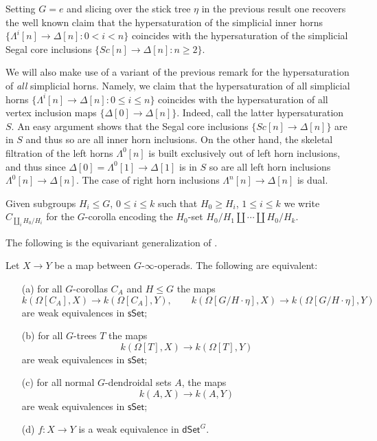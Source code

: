 \documentclass[a4paper,10pt,draft]{article}%
\numberwithin{equation}{section}%
\begin{document}
\begin{remark}
	Setting $G=e$ and slicing over the stick tree $\eta$ in the previous result
	one recovers the well known claim that 
	the hypersaturation of the simplicial inner horns
	$\{\Lambda^i[n] \to \Delta[n] \colon 0< i < n\}$
	coincides with the hypersaturation of the simplicial Segal core inclusions
	$\{Sc[n] \to \Delta[n]\colon n \geq 2\}$.
\end{remark}


\begin{remark}\label{HYPERSATKAN REM}
	We will also make use of a variant of the previous remark for the hypersaturation of \textit{all} simplicial horns.
	Namely, we claim that the hypersaturation of all simplicial horns 
	$\{\Lambda^i[n] \to \Delta[n] \colon 0 \leq i \leq n\}$
	coincides with the hypersaturation of all vertex inclusion maps
	$\{\Delta[0] \to \Delta[n]\}$.
	Indeed, call the latter hypersaturation $S$. 
	An easy argument shows that the Segal core inclusions 
	$\{Sc[n] \to \Delta[n]\}$ are in $S$ and thus so are all inner horn inclusions. On the other hand, the skeletal filtration of the left horns $\Lambda^0[n]$ is built exclusively out of left horn inclusions, and thus since $\Delta[0]=\Lambda^0[1] \to \Delta[1]$ is in $S$ so are all left horn inclusions 
	$\Lambda^0[n] \to \Delta[n]$. The case of right horn inclusions $\Lambda^n[n] \to \Delta[n]$ is dual.
\end{remark}

\begin{notation}
Given subgroups $H_i \leq G$, $0\leq i \leq k$ such that
$H_0 \geq H_i$, $1 \leq i \leq k$ we write
$C_{\amalg_i H_0/H_i}$ for the $G$-corolla encoding the 
$H_0$-set $H_0/H_1 \amalg \cdots \amalg H_0/H_k$.
\end{notation}


The following is the equivariant generalization of 
\cite[Thm. 3.5]{CM13a}.

\begin{proposition}\label{TFAE PROP}
Let $X \to Y$ be a map between $G$-$\infty$-operads. The following are equivalent:
\begin{enumerate}
	\item[(a)] for all $G$-corollas $C_A$ and $H\leq G$ the maps
\[k(\Omega[C_A],X) \to k(\Omega[C_A],Y), \qquad
k(\Omega[G/H \cdot \eta],X) \to k(\Omega[G/H \cdot \eta],Y)
\]
are weak equivalences in $\mathsf{sSet}$;
	\item[(b)] for all $G$-trees $T$ the maps 
	\[k(\Omega[T],X) \to k(\Omega[T],Y) \]
are weak equivalences in $\mathsf{sSet}$;
	\item[(c)] for all normal $G$-dendroidal sets $A$, the maps
	\[k(A,X) \to k(A,Y) \]
are weak equivalences in $\mathsf{sSet}$;
	\item[(d)] $f \colon X \to Y$ is a weak equivalence in 
	$\mathsf{dSet}^G$.
\end{enumerate}
\end{proposition}
\end{document}
